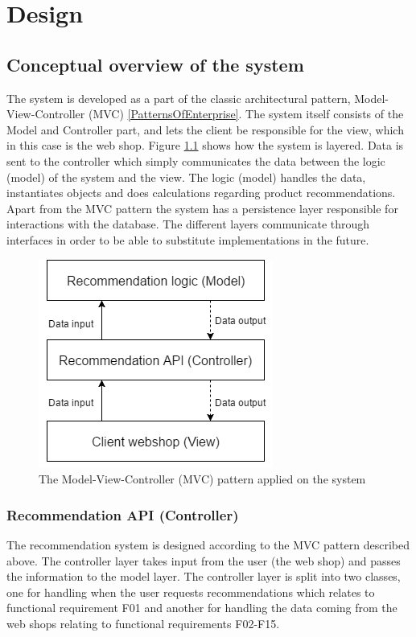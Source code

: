 
\chapter{Design} %

\label{Chapter3} %


\section{Conceptual overview of the system}
The system is developed as a part of the classic architectural pattern, Model-View-Controller (MVC) \ref{PatternsOfEnterprise}. The system itself consists of the Model and Controller part, and lets the client be responsible for the view, which in this case is the web shop. Figure \ref{fig:MVC} shows how the system is layered. Data is sent to the controller which simply communicates the data between the logic (model) of the system and the view. The logic (model) handles the data, instantiates objects and does calculations regarding product recommendations. \\
Apart from the MVC pattern the system has a persistence layer responsible for interactions with the database. The different layers communicate through interfaces in order to be able to substitute implementations in the future. 

\begin{figure}[H]
	\centering
	\includegraphics[width=.4\linewidth]{Figures/MVC.png}
	\caption{The Model-View-Controller (MVC) pattern applied on the system}
	\label{fig:MVC}
\end{figure}

\subsection{Recommendation API (Controller)}
The recommendation system is designed according to the MVC pattern described above. The controller layer takes input from the user (the web shop) and passes the information to the model layer. The controller layer is split into two classes, one for handling when the user requests recommendations which relates to functional requirement F01 and another for handling the data coming from the web shops relating to functional requirements F02-F15.

